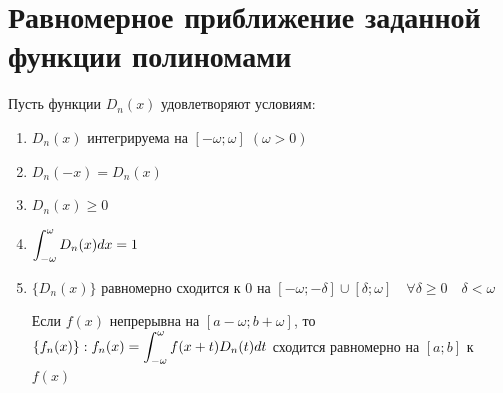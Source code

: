 \section{Равномерное приближение заданной функции полиномами}

\begin{theorem}
    Пусть функции $D_n(x)$ удовлетворяют условиям:

    \begin{enumerate}
        \item $D_n(x)$ интегрируема на $[-\omega; \omega] \; (\omega > 0)$
        \item $D_n(-x) = D_n(x)$
        \item $D_n(x) \geq 0$
        \item $\displaystyle\int_{-\omega}^\omega D_n(x) dx = 1$
        \item 
            $\{ D_n(x) \}$ равномерно сходится к $0$ на 
            $[-\omega; -\delta] \cup [\delta; \omega] \quad
            \forall \delta \geq 0 \quad \delta < \omega$

            Если $f(x)$ непрерывна на $[a - \omega; b + \omega]$, то
            $\{ f_n(x) \} : f_n(x) = 
            \displaystyle\int_{-\omega}^\omega f(x + t) D_n(t) dt$ сходится равномерно 
            на $[a; b]$ к $f(x)$
    \end{enumerate}
\end{theorem}
